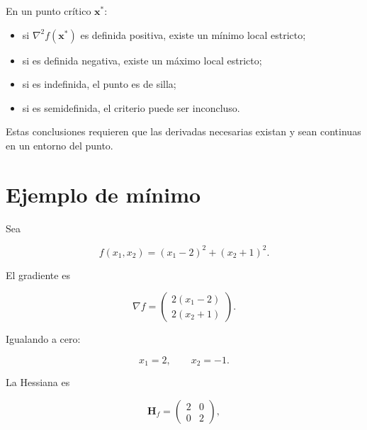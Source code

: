\documentclass[
  spanish,
  10.5pt,
  letterpaper,
  DIV=11,
  numbers=noendperiod,
  oneside,
  open=any]{scrreprt}
\providecommand{\tightlist}{%
  \setlength{\itemsep}{0pt}\setlength{\parskip}{0pt}}
\theoremstyle{definition}
\theoremstyle{definition}
\theoremstyle{plain}
\theoremstyle{remark}
\begin{document}
\begin{tcolorbox}[enhanced jigsaw, arc=.35mm, bottomrule=.15mm, bottomtitle=1mm, breakable, colback=white, colbacktitle=quarto-callout-important-color!10!white, colframe=quarto-callout-important-color-frame, coltitle=black, left=2mm, leftrule=.75mm, opacityback=0, opacitybacktitle=0.6, rightrule=.15mm, title=\textcolor{quarto-callout-important-color}{\faExclamation}\hspace{0.5em}{Criterio de la Hessiana}, titlerule=0mm, toprule=.15mm, toptitle=1mm]

En un punto crítico \(\mathbf{x}^*\):

\begin{itemize}
\tightlist
\item
  si \(\nabla^2f(\mathbf{x}^*)\) es definida positiva, existe un mínimo
  local estricto;
\item
  si es definida negativa, existe un máximo local estricto;
\item
  si es indefinida, el punto es de silla;
\item
  si es semidefinida, el criterio puede ser inconcluso.
\end{itemize}

Estas conclusiones requieren que las derivadas necesarias existan y sean
continuas en un entorno del punto.

\end{tcolorbox}

\section*{Ejemplo de mínimo}\label{ejemplo-de-muxednimo}


Sea

\[
f(x_1,x_2)
=
(x_1-2)^2
+
(x_2+1)^2.
\]

El gradiente es

\[
\nabla f
=
\begin{pmatrix}
2(x_1-2)\\
2(x_2+1)
\end{pmatrix}.
\]

Igualando a cero:

\[
x_1=2,
\qquad
x_2=-1.
\]

La Hessiana es

\[
\mathbf{H}_f
=
\begin{pmatrix}
2 & 0\\
0 & 2
\end{pmatrix},
\]
\end{document}
